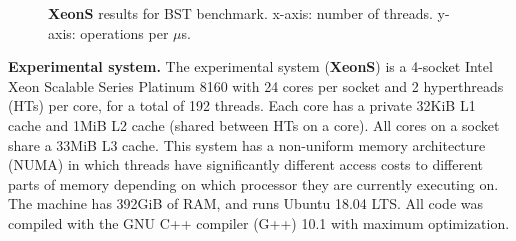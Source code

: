 \begin{figure}
    \centering
    \setlength\tabcolsep{0pt}
\caption{\textbf{XeonS} results for BST benchmark. x-axis: number of threads. y-axis: operations per $\mu$s.}
\label{fig-exp-xeons}
\end{figure}

\vspace{1mm}\noindent\textbf{Experimental system.}
The experimental system (\textbf{XeonS}) is a 4-socket Intel Xeon Scalable Series Platinum 8160 with 24 cores per socket and 2 hyperthreads (HTs) per core, for a total of 192 threads.
Each core has a private 32KiB L1 cache and 1MiB L2 cache (shared between HTs on a core).
All cores on a socket share a 33MiB L3 cache.
This system has a non-uniform memory architecture (NUMA) in which threads have significantly different access costs to different parts of memory depending on which processor they are currently executing on.
The machine has 392GiB of RAM, and runs Ubuntu 18.04 LTS.
All code was compiled with the GNU C++ compiler (G++) 10.1 with maximum optimization.

